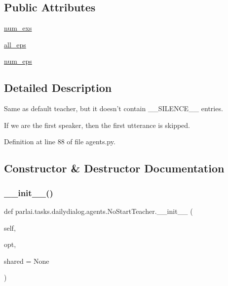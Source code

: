 \subsection*{Public Attributes}
\begin{DoxyCompactItemize}
\item 
\hyperlink{classparlai_1_1tasks_1_1dailydialog_1_1agents_1_1NoStartTeacher_aab39a1a4cec18469e61f2431e85b6fd1}{num\+\_\+exs}
\item 
\hyperlink{classparlai_1_1tasks_1_1dailydialog_1_1agents_1_1NoStartTeacher_adb1dd6164639fbe3d4bf53a26f0431ee}{all\+\_\+eps}
\item 
\hyperlink{classparlai_1_1tasks_1_1dailydialog_1_1agents_1_1NoStartTeacher_ac31b7ae1fa0c534af1530fe395d90252}{num\+\_\+eps}
\end{DoxyCompactItemize}


\subsection{Detailed Description}
\begin{DoxyVerb}Same as default teacher, but it doesn't contain __SILENCE__ entries.

If we are the first speaker, then the first utterance is skipped.
\end{DoxyVerb}
 

Definition at line 88 of file agents.\+py.



\subsection{Constructor \& Destructor Documentation}
\mbox{\label{classparlai_1_1tasks_1_1dailydialog_1_1agents_1_1NoStartTeacher_aa9ca29c5550b1ec3fe80c7254e36aead}} 
\subsubsection{\texorpdfstring{\+\_\+\+\_\+init\+\_\+\+\_\+()}{\_\_init\_\_()}}
{\footnotesize\ttfamily def parlai.\+tasks.\+dailydialog.\+agents.\+No\+Start\+Teacher.\+\_\+\+\_\+init\+\_\+\+\_\+ (\begin{DoxyParamCaption}\item[{}]{self,  }\item[{}]{opt,  }\item[{}]{shared = {\ttfamily None} }\end{DoxyParamCaption})}



